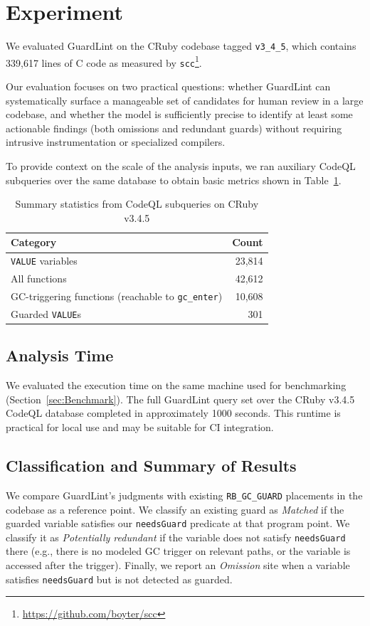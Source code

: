 \section{Experiment}\label{sec:Experiment}
We evaluated GuardLint on the CRuby codebase tagged \texttt{v3\_4\_5}, which contains 339{,}617 lines of C code as measured by \texttt{scc}\footnote{\url{https://github.com/boyter/scc}}.

Our evaluation focuses on two practical questions: whether GuardLint can systematically surface a manageable set of candidates for human review in a large codebase, and whether the model is sufficiently precise to identify at least some actionable findings (both omissions and redundant guards) without requiring intrusive instrumentation or specialized compilers.

To provide context on the scale of the analysis inputs, we ran auxiliary CodeQL subqueries over the same database to obtain basic metrics shown in Table~\ref{tab:codeql_subquery_stats}.

\begin{table}[ht]
\centering
\caption{Summary statistics from CodeQL subqueries on CRuby v3.4.5}
\label{tab:codeql_subquery_stats}
\begin{tabular}{lr}
\toprule
\textbf{Category} & \textbf{Count} \\
\midrule
\texttt{VALUE} variables & 23{,}814 \\
All functions & 42{,}612 \\
GC-triggering functions (reachable to \texttt{gc\_enter}) & 10{,}608 \\
Guarded \texttt{VALUE}s & 301 \\
\bottomrule
\end{tabular}
\end{table}

\subsection{Analysis Time}
We evaluated the execution time on the same machine used for benchmarking (Section~\ref{sec:Benchmark}). The full GuardLint query set over the CRuby v3.4.5 CodeQL database completed in approximately 1000 seconds. This runtime is practical for local use and may be suitable for CI integration.

\subsection{Classification and Summary of Results}
We compare GuardLint's judgments with existing \texttt{RB\_GC\_GUARD} placements in the codebase as a reference point. We classify an existing guard as \emph{Matched} if the guarded variable satisfies our \texttt{needsGuard} predicate at that program point. We classify it as \emph{Potentially redundant} if the variable does not satisfy \texttt{needsGuard} there (e.g., there is no modeled GC trigger on relevant paths, or the variable is accessed after the trigger). Finally, we report an \emph{Omission} site when a variable satisfies \texttt{needsGuard} but is not detected as guarded.

